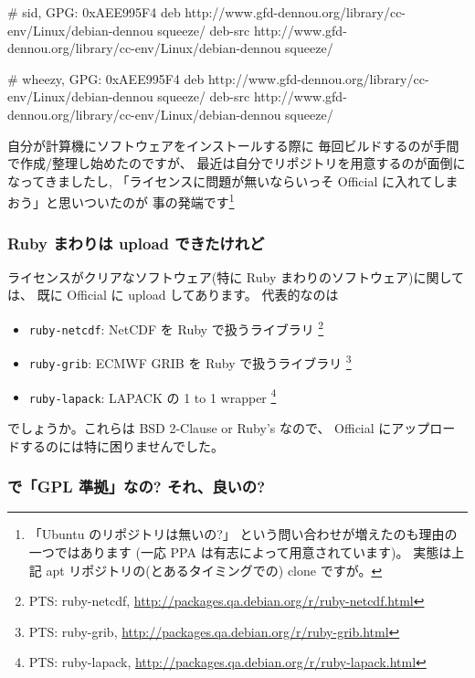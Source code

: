 \documentclass[mingoth,a4paper,twoside]{jsarticle}
\begin{document}
\begin{commandline}
  # sid, GPG: 0xAEE995F4
  deb http://www.gfd-dennou.org/library/cc-env/Linux/debian-dennou squeeze/
  deb-src http://www.gfd-dennou.org/library/cc-env/Linux/debian-dennou squeeze/

  # wheezy, GPG: 0xAEE995F4
  deb http://www.gfd-dennou.org/library/cc-env/Linux/debian-dennou squeeze/
  deb-src http://www.gfd-dennou.org/library/cc-env/Linux/debian-dennou squeeze/
\end{commandline}
%
自分が計算機にソフトウェアをインストールする際に
毎回ビルドするのが手間で作成/整理し始めたのですが、
最近は自分でリポジトリを用意するのが面倒になってきましたし,
「ライセンスに問題が無いならいっそ Official に入れてしまおう」と思いついたのが
事の発端です\footnote{%
  「Ubuntu のリポジトリは無いの?」
  という問い合わせが増えたのも理由の一つではあります
  (一応 PPA は有志によって用意されています)。
  実態は上記 apt リポジトリの(とあるタイミングでの) clone ですが。
}

\subsubsection{%
  Ruby まわりは upload できたけれど
}
ライセンスがクリアなソフトウェア(特に Ruby まわりのソフトウェア)に関しては、
既に Official に upload してあります。
代表的なのは
\begin{itemize}
\item %
  \texttt{ruby-netcdf}: NetCDF を Ruby で扱うライブラリ
  \footnote{
    PTS: ruby-netcdf, \url{
      http://packages.qa.debian.org/r/ruby-netcdf.html}
  }
\item %
  \texttt{ruby-grib}: ECMWF GRIB を Ruby で扱うライブラリ
  \footnote{
    PTS: ruby-grib, \url{
      http://packages.qa.debian.org/r/ruby-grib.html}
  }
\item %
  \texttt{ruby-lapack}: LAPACK の 1 to 1 wrapper
  \footnote{
    PTS: ruby-lapack, \url{
      http://packages.qa.debian.org/r/ruby-lapack.html}
  }
\end{itemize}
でしょうか。これらは BSD 2-Clause or Ruby's なので、
Official にアップロードするのには特に困りませんでした。

\subsubsection{%
  で「GPL 準拠」なの? それ、良いの?%
}
\end{document}
